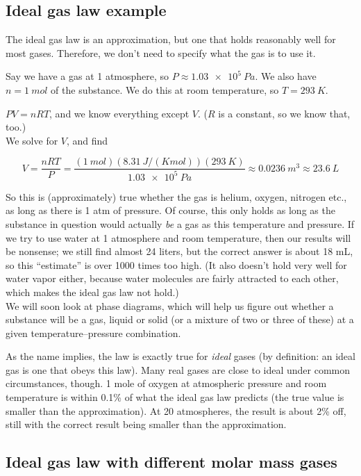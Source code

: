 \subsection{Ideal gas law example}

The ideal gas law is an approximation, but one that holds reasonably well for most gases. Therefore, we don't need to specify what the gas is to use it.

Say we have a gas at 1 atmosphere, so $P \approx \SI{1.03e5}{Pa}$. We also have $n = \SI{1}{mol}$ of the substance. We do this at room temperature, so $T = \SI{293}{K}$.

$P V = n R T$, and we know everything except $V$. ($R$ is a constant, so we know that, too.)\\
We solve for $V$, and find

\begin{equation}
V = \frac{n R T}{P} = \frac{(\SI{1}{mol})(\SI{8.31}{J/(K mol)})(\SI{293}{K})}{\SI{1.03e5}{Pa}} \approx \SI{0.0236}{m^3} \approx \SI{23.6}{L}
\end{equation}

So this is (approximately) true whether the gas is helium, oxygen, nitrogen etc., as long as there is 1 atm of pressure. Of course, this only holds as long as the substance in question would actually \emph{be} a gas as this temperature and pressure. If we try to use water at 1 atmosphere and room temperature, then our results will be nonsense; we still find almost 24 liters, but the correct answer is about 18 mL, so this ``estimate'' is over 1000 times too high. (It also doesn't hold very well for water vapor either, because water molecules are fairly attracted to each other, which makes the ideal gas law not hold.)\\
We will soon look at phase diagrams, which will help us figure out whether a substance will be a gas, liquid or solid (or a mixture of two or three of these) at a given temperature--pressure combination.

As the name implies, the law is exactly true for \emph{ideal} gases (by definition: an ideal gas is one that obeys this law). Many real gases are close to ideal under common circumstances, though. 1 mole of oxygen at atmospheric pressure and room temperature is within 0.1\% of what the ideal gas law predicts (the true value is smaller than the approximation). At 20 atmospheres, the result is about 2\% off, still with the correct result being smaller than the approximation.

\subsection{Ideal gas law with different molar mass gases}

